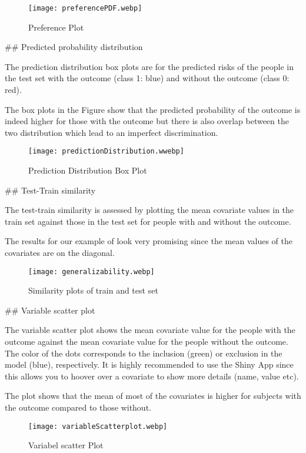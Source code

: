 \documentclass[
]{article}
\begin{document}
\begin{figure}
\centering
\texttt{[image: preferencePDF.webp]}
\caption{Preference Plot}
\end{figure}

\newpage

\#\# Predicted probability distribution

The prediction distribution box plots are for the predicted risks of the
people in the test set with the outcome (class 1: blue) and without the
outcome (class 0: red).

The box plots in the Figure show that the predicted probability of the
outcome is indeed higher for those with the outcome but there is also
overlap between the two distribution which lead to an imperfect
discrimination.

\begin{figure}
\centering
\texttt{[image: predictionDistribution.wwebp]}
\caption{Prediction Distribution Box Plot}
\end{figure}

\newpage

\#\# Test-Train similarity

The test-train similarity is assessed by plotting the mean covariate
values in the train set against those in the test set for people with
and without the outcome.

The results for our example of look very promising since the mean values
of the covariates are on the diagonal.

\begin{figure}
\centering
\texttt{[image: generalizability.webp]}
\caption{Similarity plots of train and test set}
\end{figure}

\newpage

\#\# Variable scatter plot

The variable scatter plot shows the mean covariate value for the people
with the outcome against the mean covariate value for the people without
the outcome. The color of the dots corresponds to the inclusion (green)
or exclusion in the model (blue), respectively. It is highly recommended
to use the Shiny App since this allows you to hoover over a covariate to
show more details (name, value etc).

The plot shows that the mean of most of the covariates is higher for
subjects with the outcome compared to those without.

\begin{figure}
\centering
\texttt{[image: variableScatterplot.webp]}
\caption{Variabel scatter Plot}
\end{figure}
\end{document}
